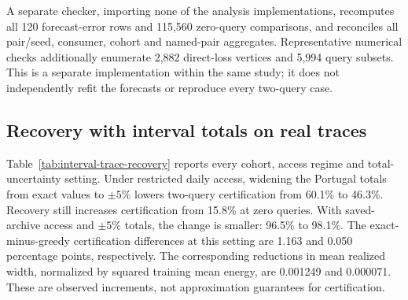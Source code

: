\documentclass[12pt]{article}
\begin{document}
A separate checker, importing none of the analysis implementations,
recomputes all 120 forecast-error rows and
115,560 zero-query comparisons,
and reconciles all pair/seed, consumer, cohort and named-pair aggregates.
Representative numerical checks additionally enumerate 2,882 direct-loss vertices
and 5,994 query subsets.
This is a separate implementation within the same study; it does not
independently refit the forecasts or reproduce every two-query case.
\FloatBarrier

\subsection{Recovery with interval totals on real traces}\label{app:interval-results}
\label{sec:interval-trace-recovery}
Table~\ref{tab:interval-trace-recovery} reports every cohort, access regime
and total-uncertainty setting. Under restricted daily access, widening the
Portugal totals from exact values to $\pm5\%$ lowers two-query certification
from 60.1\% to 46.3\%.
Recovery still increases certification from 15.8\%
at zero queries. With saved-archive access and $\pm5\%$ totals, the change
is smaller: 96.5\% to 98.1\%.
The exact-minus-greedy certification differences at this setting are
1.163 and
0.050 percentage points,
respectively. The corresponding reductions in mean realized width,
normalized by squared training mean energy, are
0.001249 and
0.000071.
These are observed increments, not approximation guarantees for certification.
\end{document}
